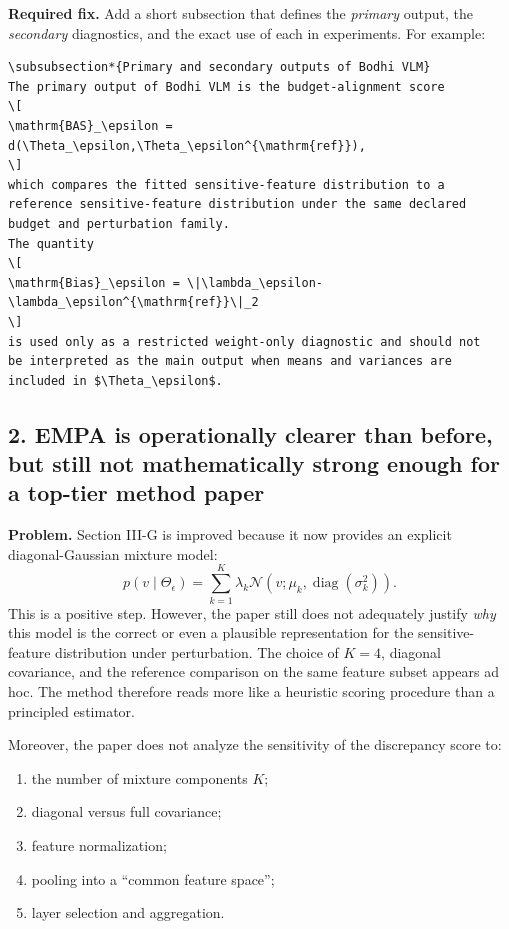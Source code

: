 \textbf{Required fix.}  
Add a short subsection that defines the \emph{primary} output, the \emph{secondary} diagnostics, and the exact use of each in experiments. For example:

\begin{verbatim}
\subsubsection*{Primary and secondary outputs of Bodhi VLM}
The primary output of Bodhi VLM is the budget-alignment score
\[
\mathrm{BAS}_\epsilon = d(\Theta_\epsilon,\Theta_\epsilon^{\mathrm{ref}}),
\]
which compares the fitted sensitive-feature distribution to a
reference sensitive-feature distribution under the same declared
budget and perturbation family.
The quantity
\[
\mathrm{Bias}_\epsilon = \|\lambda_\epsilon-\lambda_\epsilon^{\mathrm{ref}}\|_2
\]
is used only as a restricted weight-only diagnostic and should not
be interpreted as the main output when means and variances are
included in $\Theta_\epsilon$.
\end{verbatim}

\subsection*{2. EMPA is operationally clearer than before, but still not mathematically strong enough for a top-tier method paper}

\textbf{Problem.}  
Section III-G is improved because it now provides an explicit diagonal-Gaussian mixture model:
\[
p(v \mid \Theta_\epsilon)
=
\sum_{k=1}^{K}
\lambda_k
\mathcal{N}\!\left(v;\mu_k,\operatorname{diag}(\sigma_k^2)\right).
\]
This is a positive step. However, the paper still does not adequately justify \emph{why} this model is the correct or even a plausible representation for the sensitive-feature distribution under perturbation. The choice of $K=4$, diagonal covariance, and the reference comparison on the same feature subset appears ad hoc. The method therefore reads more like a heuristic scoring procedure than a principled estimator.

Moreover, the paper does not analyze the sensitivity of the discrepancy score to:
\begin{enumerate}
\item the number of mixture components $K$;
\item diagonal versus full covariance;
\item feature normalization;
\item pooling into a ``common feature space'';
\item layer selection and aggregation.
\end{enumerate}

